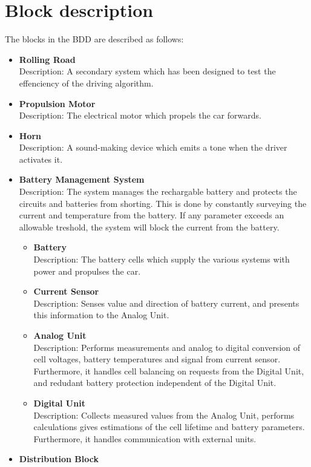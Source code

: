 \section{Block description}
The blocks in the BDD are described as follows:

\begin{itemize}
	\item \textbf{Rolling Road}\\
	Description: A secondary system which has been designed to test the effenciency of the driving algorithm.
	\item \textbf{Propulsion Motor}\\
	Description: The electrical motor which propels the car forwards.
	\item \textbf{Horn}\\
	Description: A sound-making device which emits a tone when the driver activates it.
	\item \textbf{Battery Management System}\\
	Description: The system manages the rechargable battery and protects the circuits and batteries from shorting. This is done by constantly surveying the current and temperature from the battery. If any parameter exceeds an allowable treshold, the system will block the current from the battery.
	\begin{itemize}
		\item \textbf{Battery}\\
		Description: The battery cells which supply the various systems with power and propulses the car.
		\item \textbf{Current Sensor}\\
		Description: Senses value and direction of battery current, and presents this information to the Analog Unit.
		\item \textbf{Analog Unit}\\
		Description: Performs measurements and analog to digital conversion of cell voltages, battery temperatures and signal from current sensor. Furthermore, it handles cell balancing on requests from the Digital Unit, and redudant battery protection independent of the Digital Unit.
		\item \textbf{Digital Unit}\\
		Description: Collects measured values from the Analog Unit, performs calculations gives estimations of the cell lifetime and battery parameters. Furthermore, it handles communication with external units.
	\end{itemize}
	\item \textbf{Distribution Block}\\ 

\end{itemize}
